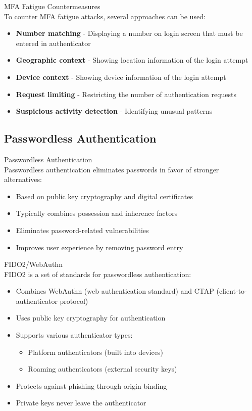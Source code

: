 \begin{concept}{MFA Fatigue Countermeasures}\\
To counter MFA fatigue attacks, several approaches can be used:
\begin{itemize}
    \item \textbf{Number matching} - Displaying a number on login screen that must be entered in authenticator
    \item \textbf{Geographic context} - Showing location information of the login attempt
    \item \textbf{Device context} - Showing device information of the login attempt
    \item \textbf{Request limiting} - Restricting the number of authentication requests
    \item \textbf{Suspicious activity detection} - Identifying unusual patterns
\end{itemize}
\end{concept}

\subsection{Passwordless Authentication}

\begin{definition}{Passwordless Authentication}\\
Passwordless authentication eliminates passwords in favor of stronger alternatives:
\begin{itemize}
    \item Based on public key cryptography and digital certificates
    \item Typically combines possession and inherence factors
    \item Eliminates password-related vulnerabilities
    \item Improves user experience by removing password entry
\end{itemize}
\end{definition}

\begin{concept}{FIDO2/WebAuthn}\\
FIDO2 is a set of standards for passwordless authentication:
\begin{itemize}
    \item Combines WebAuthn (web authentication standard) and CTAP (client-to-authenticator protocol)
    \item Uses public key cryptography for authentication
    \item Supports various authenticator types:
    \begin{itemize}
        \item Platform authenticators (built into devices)
        \item Roaming authenticators (external security keys)
    \end{itemize}
    \item Protects against phishing through origin binding
    \item Private keys never leave the authenticator
\end{itemize}
\end{concept}


